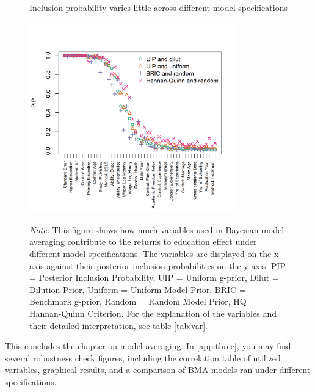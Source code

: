 \begin{figure}[!t]
\begin{center}
\caption{Inclusion probability varies little across different model specifications}
\label{fig:BMA_comparison}
\includegraphics[width=0.8\textwidth]{Figures/bma_comparison.png}
\end{center}\vspace{-0.5cm}
\captionsetup{width=0.8\textwidth, font = scriptsize}
\caption*{\emph{Note:} This figure shows how much variables used in Bayesian model averaging contribute to the returns to education effect under different model specifications. The variables are displayed on the x-axis against their posterior inclusion probabilities on the y-axis. PIP = Posterior Inclusion Probability, UIP = Uniform g-prior, Dilut = Dilution Prior, Uniform = Uniform Model Prior, BRIC = Benchmark g-prior, Random = Random Model Prior, HQ = Hannan-Quinn Criterion. For the explanation of the variables and their detailed interpretation, see table \ref{tab:var}.}
\end{figure}

This concludes the chapter on model averaging. In \autoref{app:three}, you may find several robustness check figures, including the correlation table of utilized variables, graphical results, and a comparison of \ac{BMA} models ran under different specifications.

